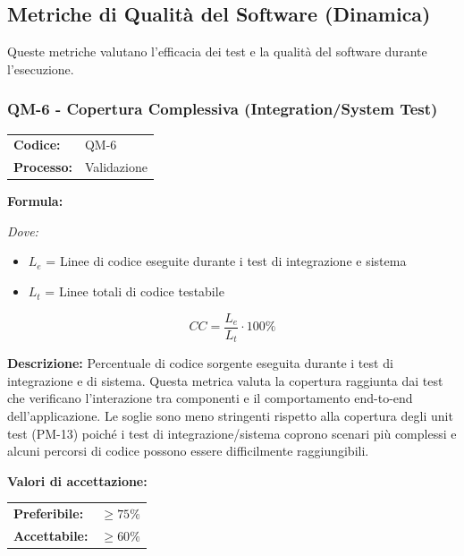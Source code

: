 \documentclass[a4paper,11pt,oneside]{scrartcl}
\begin{document}
\subsection{Metriche di Qualità del Software (Dinamica)}
Queste metriche valutano l'efficacia dei test e la qualità del software durante l'esecuzione.

\subsubsection{QM-6 - Copertura Complessiva (Integration/System Test)}

\noindent
\begin{tabular}{@{}p{}p{}@{}}
\textbf{Codice:} & QM-6 \\
\textbf{Processo:} & Validazione \\
\end{tabular}

\vspace{0.3cm}
\noindent\textbf{Formula:}

\noindent\textit{Dove:}
\begin{itemize}[leftmargin=1.5cm, topsep=0pt, itemsep=0pt]
    \item $L_e$ = Linee di codice eseguite durante i test di integrazione e sistema
    \item $L_t$ = Linee totali di codice testabile
\end{itemize}

\[
CC = \frac{L_e}{L_t} \cdot 100\%
\]

\noindent\textbf{Descrizione:} Percentuale di codice sorgente eseguita durante i test di integrazione e di sistema. Questa metrica valuta la copertura raggiunta dai test che verificano l'interazione tra componenti e il comportamento end-to-end dell'applicazione. Le soglie sono meno stringenti rispetto alla copertura degli unit test (PM-13) poiché i test di integrazione/sistema coprono scenari più complessi e alcuni percorsi di codice possono essere difficilmente raggiungibili.

\vspace{0.2cm}
\noindent\textbf{Valori di accettazione:}
\vspace{0.1cm}

\noindent
\begin{tabular}{@{}ll@{}}
\textbf{Preferibile:} & $\ge 75\%$ \\
\textbf{Accettabile:} & $\ge 60\%$ \\
\end{tabular}
\end{document}
